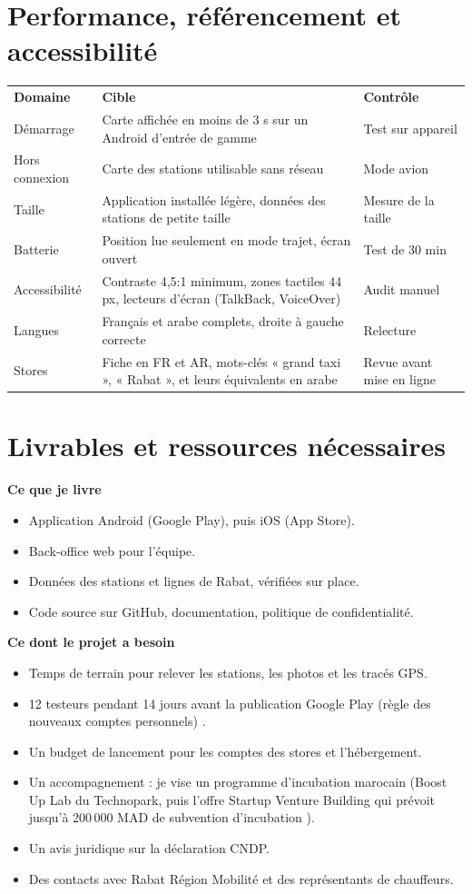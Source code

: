 \documentclass[11pt,a4paper]{article}
\newcommand{\hd}[1]{\textbf{\color{white}#1}}
\newcommand{\hdrow}{\rowcolor{brand}}
\begin{document}
\section{Performance, référencement et accessibilité}
\begin{xltabular}{\textwidth}{@{}l Y l@{}}
\hdrow \hd{Domaine} & \hd{Cible} & \hd{Contrôle} \\
Démarrage & Carte affichée en moins de 3 s sur un Android d'entrée de gamme & Test sur appareil \\
Hors connexion & Carte des stations utilisable sans réseau & Mode avion \\
Taille & Application installée légère, données des stations de petite taille & Mesure de la taille \\
Batterie & Position lue seulement en mode trajet, écran ouvert & Test de 30 min \\
Accessibilité & Contraste 4,5:1 minimum, zones tactiles 44 px, lecteurs d'écran (TalkBack, VoiceOver) & Audit manuel \\
Langues & Français et arabe complets, droite à gauche correcte & Relecture \\
Stores & Fiche en FR et AR, mots-clés « grand taxi », « Rabat », et leurs équivalents en arabe & Revue avant mise en ligne \\
\end{xltabular}

\Needspace{6cm}
\section{Livrables et ressources nécessaires}
\textbf{Ce que je livre}
\begin{itemize}
\item Application Android (Google Play), puis iOS (App Store).
\item Back-office web pour l'équipe.
\item Données des stations et lignes de Rabat, vérifiées sur place.
\item Code source sur GitHub, documentation, politique de confidentialité.
\end{itemize}

\textbf{Ce dont le projet a besoin}
\begin{itemize}[label=$\square$]
\item Temps de terrain pour relever les stations, les photos et les tracés GPS.
\item 12 testeurs pendant 14 jours avant la publication Google Play (règle des nouveaux comptes personnels) \cite{stores}.
\item Un budget de lancement pour les comptes des stores et l'hébergement.
\item Un accompagnement : je vise un programme d'incubation marocain (Boost Up Lab du Technopark, puis l'offre Startup Venture Building qui prévoit jusqu'à 200\,000 MAD de subvention d'incubation \cite{vb}).
\item Un avis juridique sur la déclaration CNDP.
\item Des contacts avec Rabat Région Mobilité et des représentants de chauffeurs.
\end{itemize}
\end{document}
